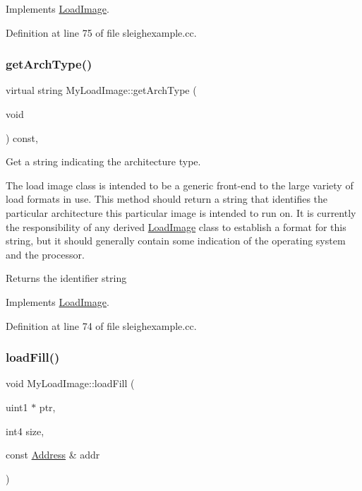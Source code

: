 Implements \mbox{\hyperlink{class_load_image_a51a254f705fba6f0e6524995acd5aaa7}{Load\+Image}}.



Definition at line 75 of file sleighexample.\+cc.

\mbox{\label{class_my_load_image_aae5307e132d6736494b7da8ace1b41f1}} 
\subsubsection{\texorpdfstring{getArchType()}{getArchType()}}
{\footnotesize\ttfamily virtual string My\+Load\+Image\+::get\+Arch\+Type (\begin{DoxyParamCaption}\item[{void}]{ }\end{DoxyParamCaption}) const\hspace{0.3cm}{\ttfamily [inline]}, {\ttfamily [virtual]}}



Get a string indicating the architecture type. 

The load image class is intended to be a generic front-\/end to the large variety of load formats in use. This method should return a string that identifies the particular architecture this particular image is intended to run on. It is currently the responsibility of any derived \mbox{\hyperlink{class_load_image}{Load\+Image}} class to establish a format for this string, but it should generally contain some indication of the operating system and the processor. \begin{DoxyReturn}{Returns}
the identifier string 
\end{DoxyReturn}


Implements \mbox{\hyperlink{class_load_image_a5103418147e95994f66e77746c0a0cfc}{Load\+Image}}.



Definition at line 74 of file sleighexample.\+cc.

\mbox{\label{class_my_load_image_ac06717c19db7a80515b6f330540bce1d}} 
\subsubsection{\texorpdfstring{loadFill()}{loadFill()}}
{\footnotesize\ttfamily void My\+Load\+Image\+::load\+Fill (\begin{DoxyParamCaption}\item[{uint1 $\ast$}]{ptr,  }\item[{int4}]{size,  }\item[{const \mbox{\hyperlink{class_address}{Address}} \&}]{addr }\end{DoxyParamCaption})\hspace{0.3cm}{\ttfamily [virtual]}}



